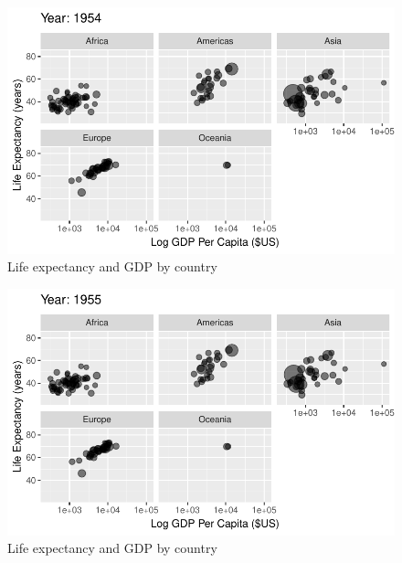 \documentclass[
  letterpaper,
  DIV=11,
  numbers=noendperiod]{scrreport}
\theoremstyle{definition}
\theoremstyle{remark}
\begin{document}
\begin{figure}

{\centering \includegraphics{index_files/figure-pdf/fig-anim-lifegdp-5.pdf}

}

\caption{\label{fig-anim-lifegdp-5}Life expectancy and GDP by country}

\end{figure}

\begin{figure}

{\centering \includegraphics{index_files/figure-pdf/fig-anim-lifegdp-6.pdf}

}

\caption{\label{fig-anim-lifegdp-6}Life expectancy and GDP by country}

\end{figure}
\end{document}
